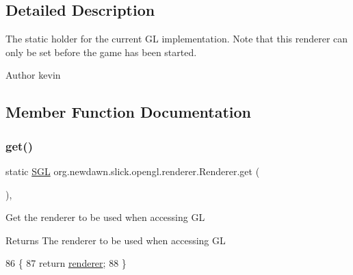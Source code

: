 \subsection{Detailed Description}
The static holder for the current GL implementation. Note that this renderer can only be set before the game has been started.

\begin{DoxyAuthor}{Author}
kevin 
\end{DoxyAuthor}


\subsection{Member Function Documentation}
\mbox{\label{classorg_1_1newdawn_1_1slick_1_1opengl_1_1renderer_1_1_renderer_abe742c3a7dfca67c6c01821d27087308}} 
\subsubsection{\texorpdfstring{get()}{get()}}
{\footnotesize\ttfamily static \mbox{\hyperlink{interfaceorg_1_1newdawn_1_1slick_1_1opengl_1_1renderer_1_1_s_g_l}{S\+GL}} org.\+newdawn.\+slick.\+opengl.\+renderer.\+Renderer.\+get (\begin{DoxyParamCaption}{ }\end{DoxyParamCaption})\hspace{0.3cm}{\ttfamily [inline]}, {\ttfamily [static]}}

Get the renderer to be used when accessing GL

\begin{DoxyReturn}{Returns}
The renderer to be used when accessing GL 
\end{DoxyReturn}

\begin{DoxyCode}
86                             \{
87         \textcolor{keywordflow}{return} \mbox{\hyperlink{classorg_1_1newdawn_1_1slick_1_1opengl_1_1renderer_1_1_renderer_abe140c4ec95e1ff80b86eb12a3508713}{renderer}};
88     \}
\end{DoxyCode}
\mbox{\label{classorg_1_1newdawn_1_1slick_1_1opengl_1_1renderer_1_1_renderer_a8e231c62dce8d884fd0b26beed63e743}} 
